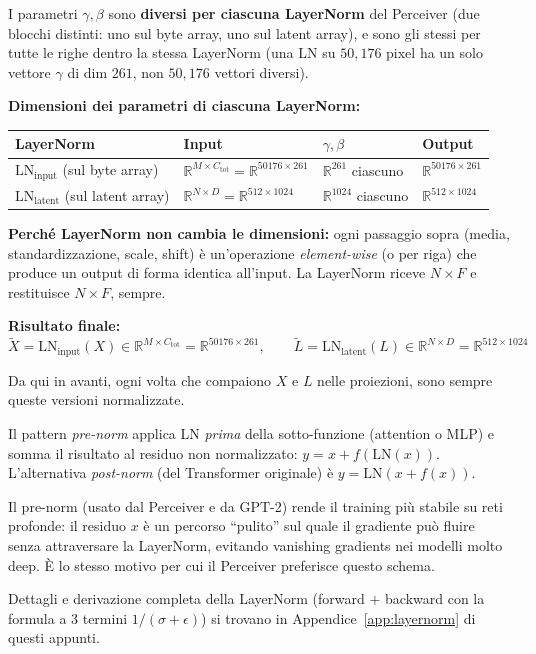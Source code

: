 \documentclass[
  11pt,
]{article}
\begin{document}
I parametri $\gamma, \beta$ sono \textbf{diversi per ciascuna LayerNorm} del Perceiver (due blocchi distinti: uno sul byte array, uno sul latent array), e sono gli stessi per tutte le righe dentro la stessa LayerNorm (una LN su $50{,}176$ pixel ha un solo vettore $\gamma$ di dim $261$, non $50{,}176$ vettori diversi).

\medskip
\textbf{Dimensioni dei parametri di ciascuna LayerNorm:}

\begin{center}
\begin{tabular}{@{}llll@{}}
\toprule
\textbf{LayerNorm} & \textbf{Input} & \textbf{$\gamma, \beta$} & \textbf{Output} \\
\midrule
$\mathrm{LN}_\text{input}$ (sul byte array) & $\mathbb{R}^{M \times C_{\text{tot}}} = \mathbb{R}^{50176 \times 261}$ & $\mathbb{R}^{261}$ ciascuno & $\mathbb{R}^{50176 \times 261}$ \\
$\mathrm{LN}_\text{latent}$ (sul latent array) & $\mathbb{R}^{N \times D} = \mathbb{R}^{512 \times 1024}$ & $\mathbb{R}^{1024}$ ciascuno & $\mathbb{R}^{512 \times 1024}$ \\
\bottomrule
\end{tabular}
\end{center}

\medskip
\textbf{Perché LayerNorm non cambia le dimensioni:} ogni passaggio sopra (media, standardizzazione, scale, shift) è un'operazione \emph{element-wise} (o per riga) che produce un output di forma identica all'input. La LayerNorm riceve $N \times F$ e restituisce $N \times F$, sempre.

\medskip
\textbf{Risultato finale:}
\[
\tilde{X} = \mathrm{LN}_\text{input}(X) \in \mathbb{R}^{M \times C_{\text{tot}}} = \mathbb{R}^{50176 \times 261}, \qquad \tilde{L} = \mathrm{LN}_\text{latent}(L) \in \mathbb{R}^{N \times D} = \mathbb{R}^{512 \times 1024}
\]

Da qui in avanti, ogni volta che compaiono $X$ e $L$ nelle proiezioni, sono sempre queste versioni normalizzate.

\begin{notabox}[title={\textbf{Perché LayerNorm \emph{prima} dell'attention (pre-norm)?}}]
Il pattern \emph{pre-norm} applica LN \emph{prima} della sotto-funzione (attention o MLP) e somma il risultato al residuo non normalizzato: $y = x + f(\mathrm{LN}(x))$. L'alternativa \emph{post-norm} (del Transformer originale) è $y = \mathrm{LN}(x + f(x))$.

Il pre-norm (usato dal Perceiver e da GPT-2) rende il training più stabile su reti profonde: il residuo $x$ è un percorso ``pulito'' sul quale il gradiente può fluire senza attraversare la LayerNorm, evitando vanishing gradients nei modelli molto deep. È lo stesso motivo per cui il Perceiver preferisce questo schema.

Dettagli e derivazione completa della LayerNorm (forward $+$ backward con la formula a 3 termini $1/(\sigma + \epsilon)$) si trovano in Appendice~\ref{app:layernorm} di questi appunti.
\end{notabox}
\end{document}
